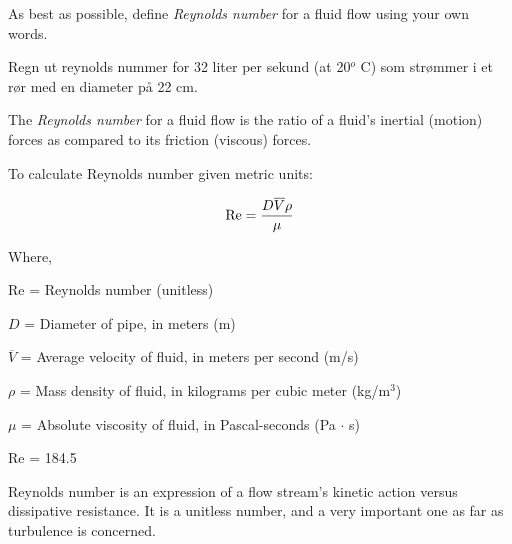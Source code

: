 

As best as possible, define {\it Reynolds number} for a fluid flow using your own words.

\vskip 10pt

Regn ut reynolds nummer for 32 liter per sekund (at 20$^{o}$ C) som strømmer i et rør med en diameter på 22 cm. 








The {\it Reynolds number} for a fluid flow is the ratio of a fluid's inertial (motion) forces as compared to its friction (viscous) forces.

\vskip 30pt
 
To calculate Reynolds number given metric units:

$$\hbox{Re} = {{D \overline{V} \rho} \over \mu}$$

\noindent
Where,

Re = Reynolds number (unitless)

$D$ = Diameter of pipe, in meters (m)

$\overline{V}$ = Average velocity of fluid, in meters per second (m/s)

$\rho$ = Mass density of fluid, in kilograms per cubic meter (kg/m$^{3}$)

$\mu$ = Absolute viscosity of fluid, in Pascal-seconds (Pa $\cdot$ s)

\vskip 60pt \goodbreak

Re = 184.5







Reynolds number is an expression of a flow stream's kinetic action versus dissipative resistance.  It is a unitless number, and a very important one as far as turbulence is concerned.




